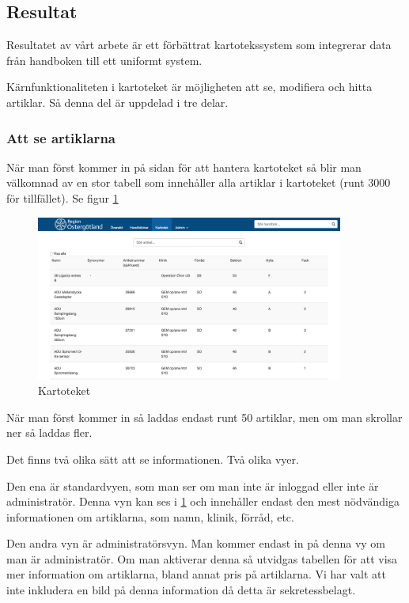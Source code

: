 \clearpage
\subsection{Resultat}
Resultatet av vårt arbete är ett förbättrat kartotekssystem
som integrerar data från handboken till ett
uniformt system.

Kärnfunktionaliteten i kartoteket är möjligheten att se, modifiera och hitta artiklar.
Så denna del är uppdelad i tre delar.

\subsubsection{Att se artiklarna}
När man först kommer in på sidan för att hantera kartoteket så
blir man välkomnad av en stor tabell som innehåller alla artiklar
i kartoteket (runt 3000 för tillfället). Se figur \ref{fig:table}
\begin{figure}
  \centering
  \includegraphics[width=0.9\textwidth]{../images/kartotek1.png}
  \caption{Kartoteket}
  \label{fig:table}
\end{figure}
När man först kommer in så laddas endast runt 50 artiklar, men
om man skrollar ner så laddas fler.

Det finns två olika sätt att se informationen.
Två olika vyer.

Den ena är standardvyen, som man ser om man inte är inloggad
eller inte är administratör. Denna vyn kan ses i \ref{fig:table}
och innehåller endast den mest nödvändiga informationen om
artiklarna, som namn, klinik, förråd, etc.

Den andra vyn är administratörsvyn.
Man kommer endast in på denna vy om man är administratör.
Om man aktiverar denna så utvidgas tabellen för att
visa mer information om artiklarna, bland annat pris på artiklarna.
Vi har valt att inte inkludera en bild på denna information
då detta är sekretessbelagt.

